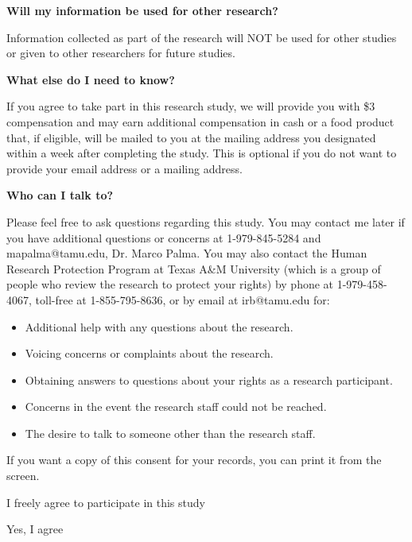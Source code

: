 \documentclass[12pt]{article}
\begin{document}
\textbf{Will my information be used for other research?} \par
Information collected as part of the research will NOT be used for other studies or given to other researchers for future studies. \par

\textbf{What else do I need to know?} \par

If you agree to take part in this research study, we will provide you with  \$3 compensation and may earn additional compensation in cash or a food product that, if eligible, will be mailed to you at the mailing address you designated within a week after completing the study. This is optional if you do not want to provide your email address or a mailing address. \par

\textbf{Who can I talk to?} \par

Please feel free to ask questions regarding this study. You may contact me later if you have additional questions or concerns at 1-979-845-5284 and mapalma@tamu.edu, Dr. Marco Palma. You may also contact the Human Research Protection Program at Texas A\&M University (which is a group of people who review the research to protect your rights) by phone at 1-979-458-4067, toll-free at 1-855-795-8636, or by email at irb@tamu.edu for:\par

\begin{itemize}
    \item Additional help with any questions about the research.
    \item Voicing concerns or complaints about the research.
    \item Obtaining answers to questions about your rights as a research participant.
    \item Concerns in the event the research staff could not be reached.
    \item The desire to talk to someone other than the research staff.
\end{itemize} \par



If you want a copy of this consent for your records, you can print it from the screen. \par

I freely agree to participate in this study \par
[Dropdown menu options:] \par
Yes, I agree \par
\end{document}

